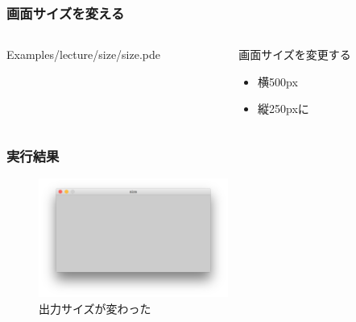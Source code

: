 \documentclass[dvipdfmx]{beamer}
\begin{document}
        \begin{frame}
            \frametitle{画面サイズを変える}
            \begin{columns}[c]
                \begin{column}{0.50\textwidth}
                    \tiny
                    Examples/lecture/size/size.pde
                    \scriptsize
                \end{column}
                \begin{column}{0.50\textwidth}
                    \begin{block}{画面サイズを変更する}
                        \begin{itemize}
                            \item 横500px
                            \item 縦250pxに
                        \end{itemize}
                    \end{block}
                \end{column}
            \end{columns}
        \end{frame}

        \begin{frame}
            \frametitle{実行結果}
                \begin{figure}[htb]
                    \includegraphics[width=62.1mm]{images/07.png}
                    \caption{出力サイズが変わった}
                    \label{fig:07}
                \end{figure}
        \end{frame}
\end{document}
